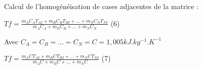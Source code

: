 \documentclass{article}
\begin{document}
\begin{flushleft}
\begin{Large}
Calcul de l'homog\'en\'eisation de cases adjacentes de la matrice :
\par\leavevmode\par

$Tf = \frac{m_{A}C_{A}T_{AI}+m_{B}C_{B}T_{BI}+...+m_{N}C_{N}T_{NI}}{m_{A}C_{A}+m_{B}C_{B}+...+m_{N}C_{N}}$ (6)
\par\leavevmode\par


Avec $C_{A}=C_{B}=...=C_{N}=C=1,005  kJ.kg^{-1}.K^{-1}$
\par\leavevmode\par

$Tf = \frac{m_{A}CT_{AI}+m_{B}CT_{BI}+...+m_{N}CT_{NI}}{m_{A}C+m_{B}C+...+m_{N}C}$ (7)






\end{Large}
\end{flushleft}
\end{document}
